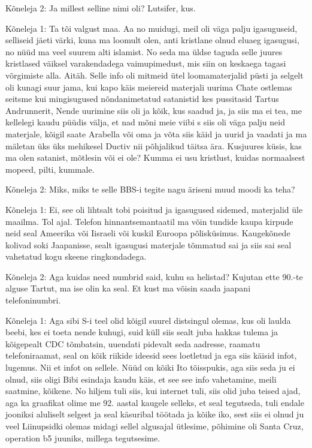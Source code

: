 Kõneleja 2:
Ja millest selline nimi oli? Lutsifer, kus.
                 
Kõneleja 1:
Ta tõi valgust maa. Aa no muidugi, meil oli väga palju igasuguseid, selliseid jäeti värki, kuna ma loomult olen, anti kristlane olnud eluaeg igasugusi, no nüüd ma veel suurem alti islamist. No seda ma üldse taguda selle juures kristlased väiksel varakendadega vaimupimedust, mis siin on keskaega tagasi võrgimiste alla. Aitäh. Selle info oli mitmeid ütel loomamaterjalid püsti ja selgelt oli kunagi suur jama, kui kapo käis meiereid materjali uurima Chate ostlemas seitsme kui mingisugused nõndanimetatud satanistid kes pussitasid Tartus Andrunnerit, Nende uurimine siis oli ja kõik, kus saadud ja, ja siis ma ei tea, me kellelegi kaudu püüdis välja, et nad mõni meie viibi s siis oli väga palju neid materjale, kõigil saate Arabella või oma ja võta siis käid ja uurid ja vaadati ja ma mäletan üks üks mehikesel Ductiv nii põhjalikud täitsa ära.
Kusjuures küsis, kas ma olen satanist, mõtlesin või ei ole? Kumma ei usu kristlust, kuidas normaalsest mopeed, pilti, kummale.
                 
Kõneleja 2:
Miks, miks te selle BBS-i tegite nagu äriseni muud moodi ka teha?
                 
Kõneleja 1:
Ei, see oli lihtsalt tobi poisitud ja igasugused sidemed, materjalid üle maailma. Tol ajal.
Telefon hinnantsemantaatil ma võin tundide kaupa kirpude neid seal Ameerika või Iisraeli või kuskil Euroopa põlisküsimus. Kaugekõnede kolivad soki Jaapanisse, sealt igasugusi materjale tõmmatud sai ja siis sai seal vahetatud kogu skeene ringkondadega.
                 
Kõneleja 2:
Aga kuidas need numbrid said, kuhu sa helistad? Kujutan ette 90.-te alguse Tartut, ma ise olin ka seal. Et kust ma võisin saada jaapani telefoninumbri.
                 
Kõneleja 1:
Aga sibi S-i teel olid kõigil suurel distsingul olemas, kus oli laulda beebi, kes ei toeta nende kuhugi, suid küll siis sealt juba hakkas tulema ja kõigepealt CDC tõmbatsin, uuendati pidevalt seda aadresse, raamatu telefoniraamat, seal on kõik riikide ideesid sees loetletud ja ega siis käisid infot, lugemus. Nii et infot on sellele. Nüüd on kõiki Ito tõisspukis, aga siis seda ju ei olnud, siis oligi Bibi esindaja kaudu käis, et see see info vahetamine, meili saatmine, kõikene. No hiljem tuli siis, kui internet tuli, siis olid juba teised ajad, aga ka graafikat olime me 92. aastal kaugele selleks, et seal tegutseda, tuli endale jooniksi aluliselt selgest ja seal käsuribal töötada ja kõike iko, sest siis ei olnud ju veel Liinupsidki olemas midagi sellel algusajal ütlesime, põhimine oli Santa Cruz, operation b5 juuniks, millega tegutsesime.
                 
